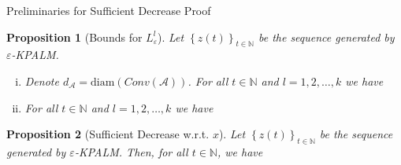\documentclass[9pt,handout]{beamer} %
\newtheorem{proposition}{Proposition}
\newcommand{\diam}{\mathrm{diam}} %
\begin{document}
	\begin{frame}{Preliminaries for Sufficient Decrease Proof}
		\begin{proposition}[Bounds for $L^l_{\varepsilon}$] \label{L_bounds_prop}
			Let $\left\lbrace z(t) \right\rbrace_{t \in \mathbb{N}}$ be the sequence generated by $\varepsilon$-KPALM.
			\begin{enumerate}[(i)]
				\item Denote $d_{\mathcal{A}} = \diam(Conv(\mathcal{A}))$. For all $t \in \mathbb{N}$ and $l=1,2, \ldots, k$ we have
				\item For all $t \in \mathbb{N}$ and $l=1,2, \ldots, k$ we have
			\end{enumerate}
		\end{proposition}
		\pause
		\begin{proposition}[Sufficient Decrease w.r.t. $x$] \label{H_eps_SD_in_x_prop}
			Let $\left\lbrace z(t) \right\rbrace_{t \in \mathbb{N}}$ be the sequence generated by $\varepsilon$-KPALM. Then, for all $t \in \mathbb{N}$, we have\\
		\end{proposition}

	\end{frame}
	
\end{document}
